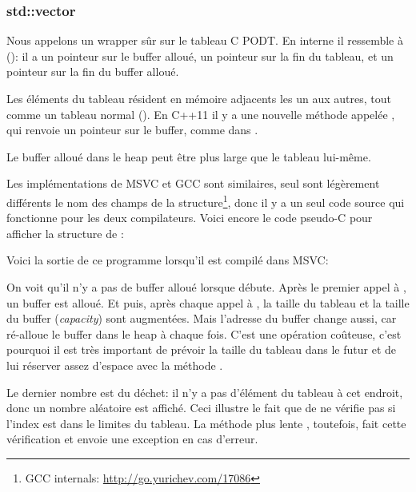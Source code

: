 \subsubsection{std::vector}

Nous appelons  un wrapper sûr sur le tableau C \ac{PODT}.
En interne il ressemble à  ():
il a un pointeur sur le buffer alloué, un pointeur sur la fin du tableau, et un pointeur
sur la fin du buffer alloué.

Les éléments du tableau résident en mémoire adjacents les un aux autres, tout comme
un tableau normal ().
En C++11 il y a une nouvelle méthode appelée , qui renvoie un pointeur
sur le buffer, comme  dans .

Le buffer alloué dans le \gls{heap} peut être plus large que le tableau lui-même.

Les implémentations de MSVC et GCC sont similaires, seul sont légèrement différents
le nom des champs de la structure\footnote{GCC internals: \url{http://go.yurichev.com/17086}},
donc il y a un seul code source qui fonctionne pour les deux compilateurs.
Voici encore le code pseudo-C pour afficher la structure de :



Voici la sortie de ce programme lorsqu'il est compilé dans MSVC:



On voit qu'il n'y a pas de buffer alloué lorsque \main débute.
Après le premier appel à , un buffer est alloué.
Et puis, après chaque appel à , la taille du tableau et la taille
du buffer (\emph{capacity}) sont augmentées.
Mais l'adresse du buffer change aussi, car  ré-alloue le buffer dans
le \gls{heap} à chaque fois.
C'est une opération coûteuse, c'est pourquoi il est très important de prévoir la
taille du tableau dans le futur et de lui réserver assez d'espace avec la méthode
.

Le dernier nombre est du déchet: il n'y a pas d'élément du tableau à cet endroit,
donc un nombre aléatoire est affiché.
Ceci illustre le fait que  de  ne vérifie pas si l'index
est dans le limites du tableau.
La méthode plus lente , toutefois, fait cette vérification et envoie une
exception  en cas d'erreur.

